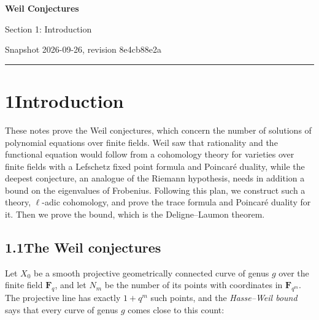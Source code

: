 \documentclass[11pt]{article}
\begin{document}
\pagestyle{plain}
\begin{center}
{\LARGE\bfseries Weil Conjectures\par}
\vspace{0.7em}
{\large Section 1: Introduction\par}
\vspace{0.5em}
{\small\color{bpmuted}Snapshot 2026-09-26, revision 8e4cb88e2a\par}
\end{center}
\vspace{0.5em}
{\small\tableofcontents}
\bigskip\hrule\bigskip

\section*{\texorpdfstring{1\quad Introduction}{1 Introduction}}
\label{bp1}%
\label{bp2}%
These notes prove the Weil conjectures, which concern the number of solutions of polynomial equations over finite fields. Weil saw that rationality and the functional equation would follow from a cohomology theory for varieties over finite fields with a Lefschetz fixed point formula and Poincaré duality, while the deepest conjecture, an analogue of the Riemann hypothesis, needs in addition a bound on the eigenvalues of Frobenius. Following this plan, we construct such a theory, \(\ell\)-adic cohomology, and prove the trace formula and Poincaré duality for it. Then we prove the bound, which is the Deligne–Laumon theorem.

\subsection*{\texorpdfstring{1.1\quad The Weil conjectures}{1.1 The Weil conjectures}}
\label{bp3}%
\label{bp4}%
Let \(X_0\) be a smooth projective geometrically connected curve of genus \(g\) over the finite field \(\mathbf F_q\), and let \(N_m\) be the number of its points with coordinates in \(\mathbf F_{q^m}\). The projective line has exactly \(1+q^m\) such points, and the \emph{Hasse–Weil bound} says that every curve of genus \(g\) comes close to this count:
\end{document}
